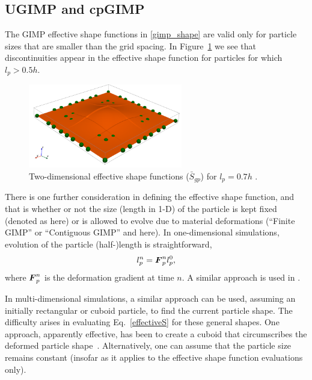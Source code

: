 \subsection{UGIMP and cpGIMP}
The GIMP effective shape functions in \eqref{gimp_shape} are valid only for
particle sizes that are smaller than the grid spacing.  In Figure~\ref{fig:gimp_large}
we see that discontinuities appear in the effective shape function for particles for 
which $l_p > 0.5 h$.
\begin{figure}[htbp!]
  \centering
  \includegraphics[width=0.6\textwidth]{Figs/mpm_basis/gimp_basis_large_particles.png}
  \caption{Two-dimensional \GIMP effective shape functions ($\bar{S}_{gp}$) for $l_p = 0.7 h$ .}
  \label{fig:gimp_large}
\end{figure}
\begin{NoteBox}
There is one further consideration in defining the effective shape function,
and that is whether or not the size (length in 1-D) of the particle is kept
fixed (denoted as  here)
or is allowed to evolve due to material deformations 
(``Finite GIMP'' or ``Contiguous GIMP'' and  here).
In one-dimensional
simulations, evolution of the particle (half-)length is straightforward,
\begin{equation} \label{particle_length}
l_p^n = \boldsymbol{F}_p^n l_p^0 , 
\end{equation} 
where $\boldsymbol{F}_p^n$ is the deformation gradient at time $n$. A similar approach is used
in .
\end{NoteBox}

In multi-dimensional simulations, a similar approach can be used, assuming
an initially rectangular or cuboid particle, to find the current particle
shape.  The difficulty arises in evaluating Eq.~\eqref{effectiveS} for
these general shapes.  One approach, apparently effective, has been to create
a cuboid that circumscribes the deformed particle shape~\cite{jinmaCMES2006}.
Alternatively, one can assume that the particle size remains constant (insofar
as it applies to the effective shape function evaluations only).

